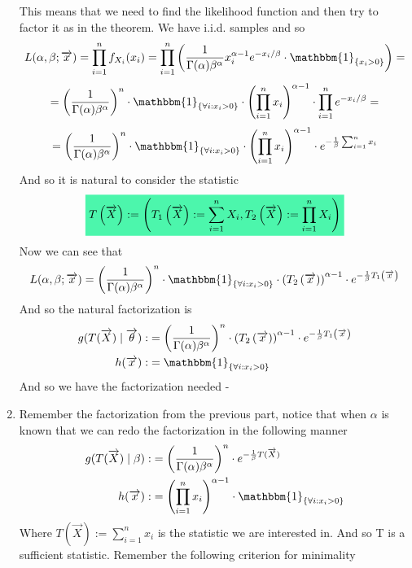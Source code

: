\documentclass[../main.tex]{subfiles}
\begin{document}
\begin{enumerate}
This means that  we need to find the likelihood function and then try to factor it as in the theorem. We have i.i.d. samples and so 
\[L(\alpha,\beta; \overrightarrow{x}) = \prod_{i=1}^n f_{X_i}(x_i) = \prod_{i=1}^n \left(\frac{1}{\Gamma(\alpha)\beta^{\alpha}}x_i^{\alpha-1}e^{-x_i/\beta}\cdot \mathbbm{1}_{\{x_i>0\}}\right)=\]
\[=\left(\frac{1}{\Gamma(\alpha)\beta^{\alpha}}\right)^n\cdot\mathbbm{1}_{\{\forall i:x_i>0\}}\cdot \left(\prod_{i=1}^n x_i\right)^{\alpha-1}\cdot \prod_{i=1}^n e^{-x_i/\beta} = \]
\[= \left(\frac{1}{\Gamma(\alpha)\beta^{\alpha}}\right)^n\cdot\mathbbm{1}_{\{\forall i:x_i>0\}}\cdot \left(\prod_{i=1}^n x_i\right)^{\alpha-1}\cdot e^{-\frac{1}{\beta} \sum_{i=1}^n x_i}\]
And so it is natural to consider the statistic
\[\mathcolorbox{goodcolor}{T\left(\overrightarrow{X}\right) := \left(T_1\left(\overrightarrow{X}\right):= \sum_{i=1}^n X_i, T_2\left(\overrightarrow{X}\right):= \prod_{i=1}^n X_i\right)}\]
Now we can see that
\[L(\alpha, \beta;\overrightarrow{x}) = \left(\frac{1}{\Gamma(\alpha)\beta^{\alpha}}\right)^n\cdot\mathbbm{1}_{\{\forall i:x_i>0\}}\cdot \left(T_2\left(\overrightarrow{x}\right)\right)^{\alpha-1}\cdot e^{-\frac{1}{\beta} T_1\left(\overrightarrow{x}\right)}\]
And so the natural factorization is
\begin{align*}
g(T(\overrightarrow{X})\mid\overrightarrow{\theta}):&= \left(\frac{1}{\Gamma(\alpha)\beta^{\alpha}}\right)^n\cdot\left(T_2\left(\overrightarrow{x}\right)\right)^{\alpha-1}\cdot e^{-\frac{1}{\beta} T_1\left(\overrightarrow{x}\right)} \\
h(\overrightarrow{x}):&= \mathbbm{1}_{\{\forall i:x_i>0\}}
\end{align*}
And so we have the factorization needed - \,\qedsymbol

\item
Remember the factorization from the previous part, notice that when $\alpha$ is known that we can redo the factorization in the following manner
\begin{align*}
g(T(\overrightarrow{X})\mid\beta):&= \left(\frac{1}{\Gamma(\alpha)\beta^{\alpha}}\right)^n\cdot e^{-\frac{1}{\beta} T(\overrightarrow{X})} \\
h(\overrightarrow{x}):&= \left(\prod_{i=1}^n x_i\right)^{\alpha-1}\cdot\mathbbm{1}_{\{\forall i:x_i>0\}}
\end{align*}
Where $T(\overrightarrow{X}):=\sum_{i=1}^n x_i$ is the statistic we are interested in. And so T is a sufficient statistic. Remember the following criterion for minimality


\end{enumerate}
\end{document}
